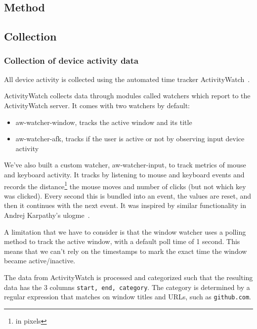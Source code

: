 \documentclass[a4paper]{article}
\begin{document}
\begin{refsection}
\section{Method}

    \subsection{Collection}

    \subsubsection{Collection of device activity data}

        All device activity is collected using the automated time tracker ActivityWatch~\cite{bjareholt_activitywatch_2020-1}.

        ActivityWatch collects data through modules called watchers which report to the ActivityWatch server. It comes with two watchers by default:

        \begin{itemize}
            \item aw-watcher-window, tracks the active window and its title
            \item aw-watcher-afk, tracks if the user is active or not by observing input device activity
        \end{itemize}

        We've also built a custom watcher, aw-watcher-input, to track metrics of mouse and keyboard activity. It tracks by listening to mouse and keyboard events and records the distance\footnote{in pixels} the mouse moves and number of clicks (but not which key was clicked). Every second this is bundled into an event, the values are reset, and then it continues with the next event. It was inspired by similar functionality in Andrej Karpathy's ulogme~\cite{ulogme}.

        A limitation that we have to consider is that the window watcher uses a polling method to track the active window, with a default poll time of 1 second. This means that we can't rely on the timestamps to mark the exact time the window became active/inactive.

        The data from ActivityWatch is processed and categorized such that the resulting data has the 3 columns \texttt{start, end, category}. The category is determined by a regular expression that matches on window titles and URLs, such as \texttt{github.com}.


\end{refsection}
\end{document}
